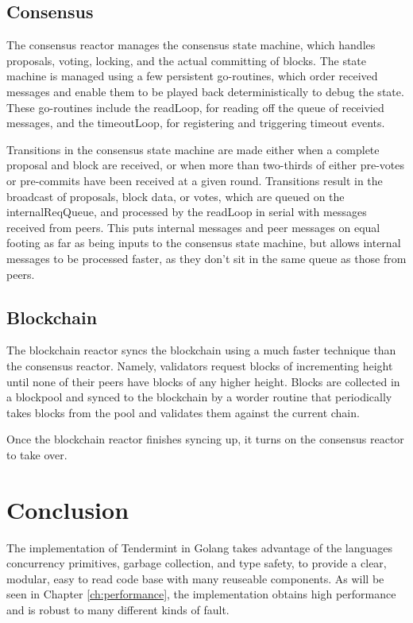 \subsection{Consensus}

The consensus reactor manages the consensus state machine, which handles proposals, voting, locking, 
and the actual committing of blocks.
The state machine is managed using a few persistent go-routines, 
which order received messages and enable them to be played back deterministically to debug the state.
These go-routines include the readLoop, for reading off the queue of receivied messages, 
and the timeoutLoop, for registering and triggering timeout events. 

Transitions in the consensus state machine are made either when a complete proposal and block are received,
or when more than two-thirds of either pre-votes or pre-commits have been received at a given round.
Transitions result in the broadcast of proposals, block data, or votes, which are queued on the internalReqQueue,
and processed by the readLoop in serial with messages received from peers.
This puts internal messages and peer messages on equal footing as far as being inputs to the consensus state machine, 
but allows internal messages to be processed faster, as they don't sit in the same queue as those from peers.

\subsection{Blockchain}

The blockchain reactor syncs the blockchain using a much faster technique than the consensus reactor.
Namely, validators request blocks of incrementing height until none of their peers have blocks of any higher height.
Blocks are collected in a blockpool and synced to the blockchain by a worder routine that periodically takes blocks from the pool
and validates them against the current chain.

Once the blockchain reactor finishes syncing up, it turns on the consensus reactor to take over.

\section{Conclusion}

The implementation of Tendermint in Golang takes advantage of the languages concurrency primitives, garbage collection, and type safety, to provide a clear, modular, easy to read code base with many reuseable components. As will be seen in Chapter \ref{ch:performance}, the implementation obtains high performance and is robust to many different kinds of fault.
